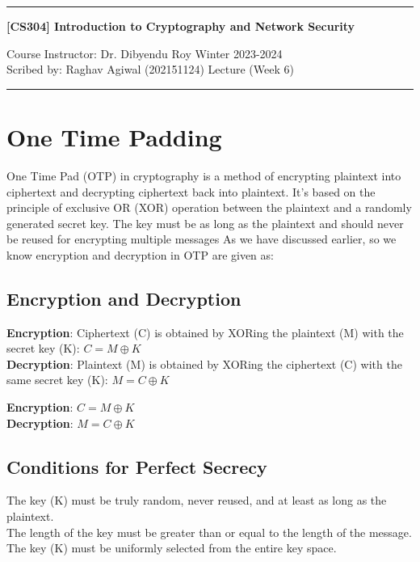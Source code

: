 \documentclass[11pt]{article}
\begin{document}
\noindent
\rule{\textwidth}{1pt}
\begin{center}
{\bf [CS304] Introduction to Cryptography and Network Security}
\end{center}
Course Instructor: Dr. Dibyendu Roy \hfill Winter 2023-2024\\
Scribed by: Raghav Agiwal (202151124) \hfill Lecture (Week 6)
\\
\rule{\textwidth}{1pt}


\section{One Time Padding}
One Time Pad (OTP) in cryptography is a method of encrypting plaintext into ciphertext and decrypting ciphertext back into plaintext. It's based on the principle of exclusive OR (XOR) operation between the plaintext and a randomly generated secret key. The key must be as long as the plaintext and should never be reused for encrypting multiple messages
As we have discussed earlier, so we know encryption and decryption in OTP are given as:

\subsection{Encryption and Decryption}

\textbf{Encryption}: Ciphertext (C) is obtained by XORing the plaintext (M) with the secret key (K): \(C = M \oplus K\) \\
\textbf{Decryption}: Plaintext (M) is obtained by XORing the ciphertext (C) with the same secret key (K): \(M = C \oplus K\)

\textbf{Encryption}: \(C = M \oplus K\) \\
\textbf{Decryption}: \(M = C \oplus K\)

\subsection{Conditions for Perfect Secrecy}

The key (K) must be truly random, never reused, and at least as long as the plaintext. \\
The length of the key must be greater than or equal to the length of the message. \\
The key (K) must be uniformly selected from the entire key space.
\end{document}
